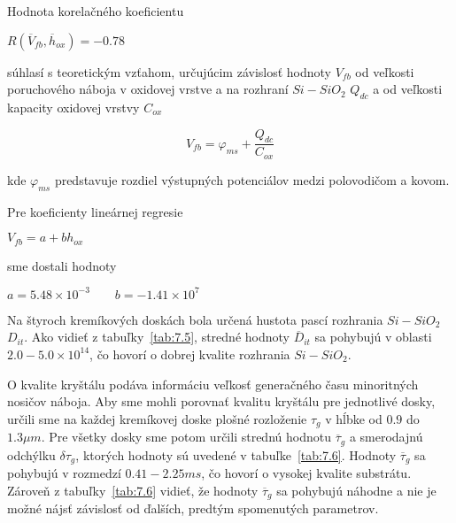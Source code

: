 Hodnota korelačného koeficientu

\centerline{$R(\overline V_{fb} ,\overline h_{ox}) = -0.78$}

súhlasí s teoretickým vzťahom, určujúcim závislosť hodnoty $V_{fb}$ od
veľkosti poruchového náboja v oxidovej vrstve a na rozhraní
$Si-SiO_{2}$ $Q_{dc}$ a od veľkosti kapacity oxidovej vrstvy $C_{ox}$

\begin{equation}\label{eq:7.3}
  V_{fb}  = \varphi_{ms} + \frac{Q_{dc}}{C_{ox}}
\end{equation}

kde $\varphi_{ms}$ predstavuje rozdiel výstupných potenciálov medzi
polovodičom a kovom.

Pre koeficienty lineárnej regresie 

\centerline{$V_{fb}  = a + b h_{ox}$}

sme dostali hodnoty 

\centerline{$a = 5.48 \times 10^{-3}  \qquad  b = -1.41 \times 10^{7}$}

Na štyroch kremíkových doskách bola určená hustota pascí rozhrania
$Si-SiO_2$ $D_{it}$. Ako vidieť z tabuľky~\ref{tab:7.5}, stredné
hodnoty $\overline D_{it}$ sa pohybujú v oblasti $2.0-5.0\times
10^{14}$, čo hovorí o dobrej kvalite rozhrania $Si-SiO_{2}$.

O kvalite kryštálu podáva informáciu veľkosť generačného času
minoritných nosičov náboja. Aby sme mohli porovnať kvalitu kryštálu
pre jednotlivé dosky, určili sme na každej kremíkovej doske plošné
rozloženie $\tau_{g}$ v hĺbke od $0.9$ do $1.3\mu m$. Pre všetky dosky
sme potom určili strednú hodnotu $\overline\tau_{g}$ a smerodajnú
odchýlku $\delta\tau_{g}$, ktorých hodnoty sú uvedené v
tabuľke~\ref{tab:7.6}. Hodnoty $\overline\tau_{g}$ sa pohybujú v
rozmedzí $0.41 - 2.25 ms$, čo hovorí o vysokej kvalite
substrátu. Zároveň z tabuľky~\ref{tab:7.6} vidieť, že hodnoty
$\overline \tau_{g}$ sa pohybujú náhodne a nie je možné nájsť
závislosť od ďalších, predtým spomenutých parametrov.

